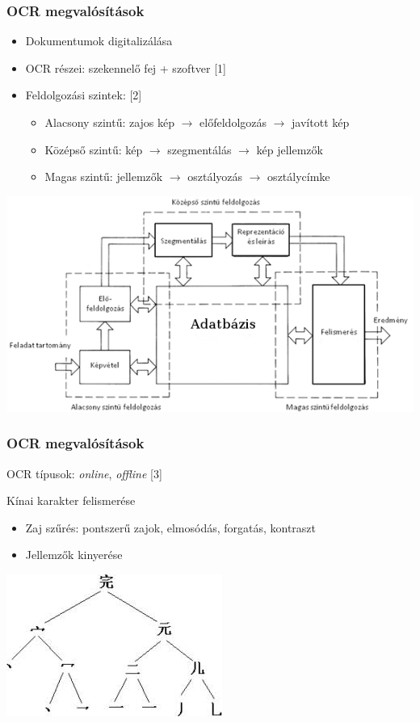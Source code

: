 \documentclass{beamer}
\begin{document}
\begin{frame}[fragile]
\frametitle{OCR megvalósítások}

\begin{itemize}
\item Dokumentumok digitalizálása
\item OCR részei: szekennelő fej + szoftver [1]
\item Feldolgozási szintek: [2]
\begin{itemize}
	\item Alacsony szintű: zajos kép $\rightarrow$ előfeldolgozás $\rightarrow$ javított kép
	\item Középső szintű: kép $\rightarrow$ szegmentálás $\rightarrow$ kép jellemzők
	\item Magas szintű: jellemzők $\rightarrow$ osztályozás $\rightarrow$ osztálycímke
\end{itemize}
\end{itemize}

\includegraphics[scale=0.45, center]{ocr}



\end{frame}

\begin{frame}[fragile]
\frametitle{OCR megvalósítások}

OCR típusok: \textit{online}, \textit{offline} [3]

\bigskip

{\large Kínai karakter felismerése}
\begin{itemize}
\item Zaj szűrés: pontszerű zajok, elmosódás, forgatás, kontraszt
\item Jellemzők kinyerése
\end{itemize}
\includegraphics[scale=0.6, center]{ocr_features}

\end{frame}
\end{document}
